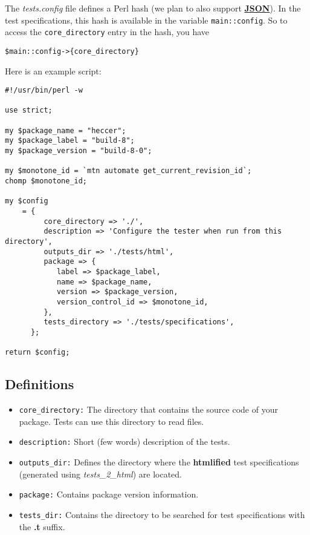 \documentclass[12pt]{article}
\begin{document}
The {\it tests.config} file defines a Perl hash (we plan to also support \href{http://www.json.org/}{\bf JSON}). In the test specifications, this hash is available in the variable {\tt main::config}. So to access the {\tt core\_directory} entry in the hash, you have
\begin{verbatim}
$main::config->{core_directory}
\end{verbatim}

Here is an example script:
\begin{verbatim}
#!/usr/bin/perl -w

use strict;

my $package_name = "heccer";
my $package_label = "build-8";
my $package_version = "build-8-0";

my $monotone_id = `mtn automate get_current_revision_id`;
chomp $monotone_id;

my $config
    = {
         core_directory => './',
         description => 'Configure the tester when run from this directory',
         outputs_dir => './tests/html',
         package => {
            label => $package_label,
            name => $package_name,
            version => $package_version,
            version_control_id => $monotone_id,
         },
         tests_directory => './tests/specifications',
      };

return $config;
\end{verbatim}

\subsection*{Definitions}

\begin{itemize}
   \item[]{\tt core\_directory:} The directory that contains the source code of your package. Tests can use this directory to read files.
   \item[]{\tt description:} Short (few words) description of the tests.
   \item[]{\tt outputs\_dir:} Defines the directory where the {\bf htmlified} test specifications (generated using {\it tests\_2\_html}) are located.
   \item[]{\tt package:} Contains package version information.
   \item[]{\tt tests\_dir:} Contains the directory to be searched for test specifications with the {\bf .t} suffix. 
\end{itemize}
\end{document}
